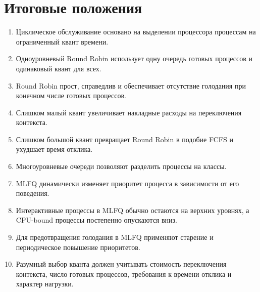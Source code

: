\documentclass[12pt,a4paper]{article}
\begin{document}
\section{Итоговые положения}

\begin{enumerate}
    \item Циклическое обслуживание основано на выделении процессора процессам на ограниченный квант времени.

    \item Одноуровневый Round Robin использует одну очередь готовых процессов и одинаковый квант для всех.

    \item Round Robin прост, справедлив и обеспечивает отсутствие голодания при конечном числе готовых процессов.

    \item Слишком малый квант увеличивает накладные расходы на переключения контекста.

    \item Слишком большой квант превращает Round Robin в подобие FCFS и ухудшает время отклика.

    \item Многоуровневые очереди позволяют разделить процессы на классы.

    \item MLFQ динамически изменяет приоритет процесса в зависимости от его поведения.

    \item Интерактивные процессы в MLFQ обычно остаются на верхних уровнях, а CPU-bound процессы постепенно опускаются вниз.

    \item Для предотвращения голодания в MLFQ применяют старение и периодическое повышение приоритетов.

    \item Разумный выбор кванта должен учитывать стоимость переключения контекста, число готовых процессов, требования к времени отклика и характер нагрузки.
\end{enumerate}
\end{document}
